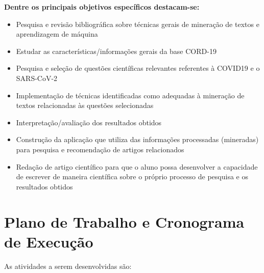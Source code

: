 \documentclass[
	12pt,				%
	a4paper,			%
	english,			%
	brazil,				%
	]{article}
\begin{document}
{\bf Dentre os principais objetivos espec\' ificos destacam-se: }
\begin{itemize}
    \item Pesquisa e revis\~ ao bibliogr\' afica sobre t\' ecnicas gerais de minera\c c\~ ao de textos e aprendizagem de m\' aquina
    \item Estudar as caracter\' isticas/informa\c c\~ oes gerais da base CORD-19
    \item Pesquisa e sele\c c\~ ao de quest\~ oes cient\' ificas relevantes referentes à COVID19 e o SARS-CoV-2
    \item Implementa\c c\~ ao de t\' ecnicas identificadas como adequadas à minera\c c\~ ao de
    textos relacionadas às quest\~ oes selecionadas
    \item Interpreta\c c\~ ao/avalia\c c\~ ao dos resultados obtidos
    \item Constru{\c c}\~ ao da aplica{\c c}\~ ao que utiliza das informa{\c c}\~ oes processadas (mineradas) para pesquisa  e recomenda{\c c}\~ ao de artigos relacionados
    \item Reda\c c\~ ao de artigo cient\' ifico para que o aluno possa desenvolver a
    capacidade de escrever de maneira cient\' ifica sobre o pr\' oprio processo de
    pesquisa e os resultados obtidos
\end{itemize}



    	
\section{Plano de Trabalho e Cronograma de Execu\c c\~ ao}
	
    As atividades a serem desenvolvidas s\~ ao:
\end{document}
